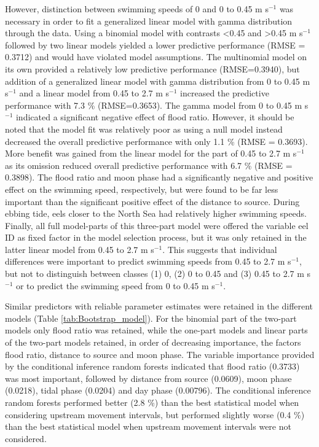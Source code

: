 \documentclass[preprint,12pt,authoryear]{elsarticle}
\begin{document}
However, distinction between swimming speeds of 0 and 0 to 0.45 m s$^{-1}$ was necessary in order to fit a generalized linear model with gamma distribution through the data. Using a binomial model with contrasts <0.45 and >0.45 m s$^{-1}$ followed by two linear models yielded a lower predictive performance (RMSE = 0.3712) and would have violated model assumptions. The multinomial model on its own provided a relatively low predictive performance (RMSE=0.3940), but addition of a generalized linear model with gamma distribution from 0 to 0.45 m s$^{-1}$ and a linear model from 0.45 to 2.7 m s$^{-1}$ increased the predictive performance with 7.3 \%  (RMSE=0.3653). The gamma model from 0 to 0.45 m s$^{-1}$ indicated a significant negative effect of flood ratio. However, it should be noted that the model fit was relatively poor as using a null model instead decreased the overall predictive performance with only 1.1 \% (RMSE = 0.3693). More benefit was gained from the linear model for the part of 0.45 to 2.7 m s$^{-1}$ as its omission reduced overall predictive performance with 6.7 \% (RMSE = 0.3898). The flood ratio and moon phase had a significantly negative and positive effect on the swimming speed, respectively, but were found to be far less important than the significant positive effect of the distance to source. During ebbing tide, eels closer to the North Sea had relatively higher swimming speeds. Finally, all full model-parts of this three-part model were offered the variable eel ID as fixed factor in the model selection process, but it was only retained in the latter linear model from 0.45 to 2.7 m s$^{-1}$. This suggests that individual differences were important to predict swimming speeds from 0.45 to 2.7 m s$^{-1}$, but not to distinguish between classes (1) 0, (2) 0 to 0.45 and (3) 0.45 to 2.7 m s$^{-1}$ or to predict the swimming speed from 0 to 0.45 m s$^{-1}$.

Similar predictors with reliable parameter estimates were retained in the different models (Table \ref{tab:Bootstrap_model}). For the binomial part of the two-part models only flood ratio was retained, while the one-part models and linear parts of the two-part models retained, in order of decreasing importance, the factors flood ratio, distance to source and moon phase. The variable importance provided by the conditional inference random forests indicated that flood ratio (0.3733) was most important, followed by distance from source (0.0609), moon phase (0.0218), tidal phase (0.0204) and day phase (0.00796). The conditional inference random forests performed better (2.8 \%) than the best statistical model when considering upstream movement intervals, but performed slightly worse (0.4 \%) than the best statistical model when  upstream movement intervals were not considered. 
\end{document}
